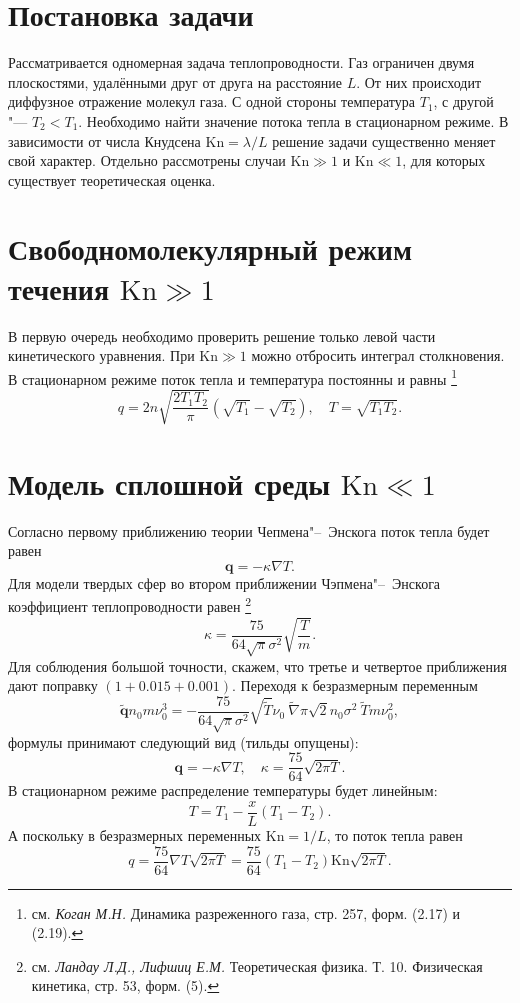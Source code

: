 \documentclass[a4paper,10pt]{article}
\newcommand{\Kn}{\mathrm{Kn}}
\begin{document}
\section{Постановка задачи}
Рассматривается одномерная задача теплопроводности.
Газ ограничен двумя плоскостями, удалёнными друг от друга на расстояние \(L\).
От них происходит диффузное отражение молекул газа.
С одной стороны температура \(T_1\), с другой "--- \(T_2<T_1\).
Необходимо найти значение потока тепла в стационарном режиме.
В зависимости от числа Кнудсена \(\Kn=\lambda/L\) решение задачи существенно меняет свой характер.
Отдельно рассмотрены случаи \(\Kn\gg1\) и \(\Kn\ll1\), для которых существует теоретическая оценка. 

\section{Свободномолекулярный режим течения \(\Kn\gg1\)}
В первую очередь необходимо проверить решение только левой части кинетического уравнения.
При \(\Kn\gg1\) можно отбросить интеграл столкновения.
В стационарном режиме поток тепла и температура постоянны и равны
\footnote{см. \textit{Коган М.Н.} Динамика разреженного газа, стр. 257, форм. (2.17) и (2.19).}
\[ q = 2n \sqrt{\frac{2T_1 T_2}\pi} \left(\sqrt{T_1}-\sqrt{T_2}\right), \quad T=\sqrt{T_1 T_2}. \]
\section{Модель сплошной среды \(\Kn\ll1\)}
Согласно первому приближению теории Чепмена"--~Энскога поток тепла будет равен
\[ \mathbf{q} = -\kappa\nabla T. \]
Для модели твердых сфер во втором приближении Чэпмена"--~Энскога коэффициент теплопроводности равен
\footnote{см. \textit{Ландау Л.Д., Лифшиц Е.М.} Теоретическая физика. Т. 10. Физическая кинетика, стр. 53, форм. (5).}
\[ \kappa = \frac{75}{64\sqrt\pi\sigma^2}\sqrt{\frac{T}{m}}. \]
Для соблюдения большой точности, скажем, что третье и четвертое приближения дают поправку \((1+0.015+0.001)\).
Переходя к безразмерным переменным
\[ \tilde{\mathbf{q}}n_0m\nu_0^3 = -\frac{75}{64\sqrt\pi\sigma^2}\sqrt{\tilde{T}} \nu_0\:\tilde{\nabla}\pi\sqrt2 n_0 \sigma^2\: \tilde{T} m\nu_0^2, \]
формулы принимают следующий вид (тильды опущены):
\[ \mathbf{q} = -\kappa \nabla T,\quad \kappa = \frac{75}{64}\sqrt{2\pi T}. \]
В стационарном режиме распределение температуры будет линейным:
\[ T = T_1 -\frac{x}{L}(T_1-T_2). \]
А поскольку в безразмерных переменных \(\Kn=1/L\), то поток тепла равен
\[ q = \frac{75}{64}\nabla T\sqrt{2\pi T} = \frac{75}{64}(T_1-T_2)\Kn\sqrt{2\pi T}. \]
\end{document}
